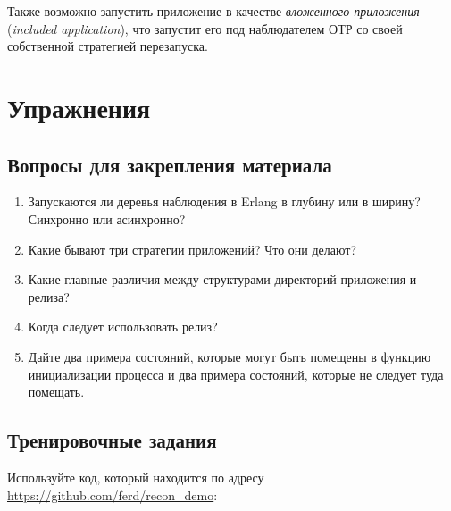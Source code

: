 \documentclass[11pt, oneside]{book}   	%
\newcommand{\HandsOnTitle}{Тренировочные задания}
\newcommand{\ReviewTitle}{Вопросы для закрепления материала}
\begin{document}
Также возможно запустить приложение в качестве \emph{вложенного приложения} (\emph{included application}), что запустит его под наблюдателем ОТР со своей собственной стратегией перезапуска.


\section{Упражнения}

\subsection*{\ReviewTitle}

\begin{enumerate}
	\item Запускаются ли деревья наблюдения в Erlang в глубину или в ширину? Синхронно или асинхронно?
	\item Какие бывают три стратегии приложений? Что они делают?
	\item Какие главные различия между структурами директорий приложения и релиза?
	\item Когда следует использовать релиз?
	\item Дайте два примера состояний, которые могут быть помещены в функцию инициализации процесса и два примера состояний, которые не следует туда помещать.
\end{enumerate}

\subsection*{\HandsOnTitle{}}

Используйте код, который находится по адресу
\href{https://github.com/ferd/recon\_demo}{https://github.com/ferd/recon\_demo}:
\end{document}
